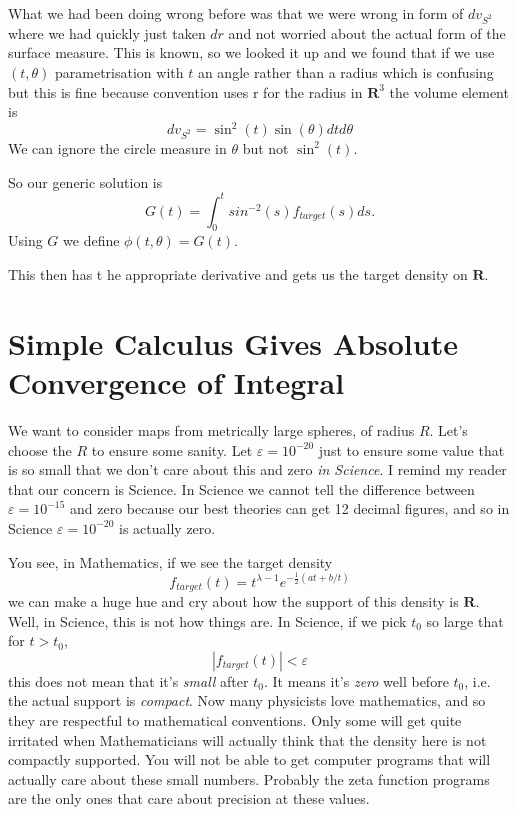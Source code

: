\documentclass{amsart}
\begin{document}
What we had been doing wrong before was that we were wrong in form of $dv_{S^2}$ where we had quickly just taken $dr$ and not worried about the actual form of the surface measure.  This is known, so we looked it up and we found that if we use $(t,\theta)$ parametrisation with $t$ an angle rather than a radius which is confusing but this is fine because convention uses r for the radius in $\mathbf{R}^3$ the volume element is
\[
dv_{S^2} = \sin^2(t) \sin(\theta) dt d\theta
\]
We can ignore the circle measure in $\theta$ but not $\sin^2(t)$.

So our generic solution is
\begin{equation}
\label{Gsol}
G(t) = \int_0^t sin^{-2}(s) f_{target}(s) ds.
\end{equation}
Using $G$ we define $\phi(t,\theta) = G(t)$.

This then has t
he appropriate derivative and gets us the target density on $\mathbf{R}$.

\section{Simple Calculus Gives Absolute Convergence of Integral}

We want to consider maps from metrically large spheres, of radius $R$.  Let's choose the $R$ to ensure some sanity.  Let $\varepsilon= 10^{-20}$ just to ensure some value that is so small that we don't care about this and zero {\em in Science}.  I remind my reader that our concern is Science.  In Science we cannot tell the difference between $\varepsilon=10^{-15}$ and zero because our best theories can get 12 decimal figures, and so in Science $\varepsilon=10^{-20}$ is actually zero.  

You see, in Mathematics, if we see the target density
\[
f_{target}(t) = t^{\lambda-1} e^{-\frac{1}{2}(at+b/t)}
\]
we can make a huge hue and cry about how the support of this density is $\mathbf{R}$.  Well, in Science, this is not how things are.  In Science, if we pick $t_0$ so large that for $t>t_0$,
\[
|f_{target}(t) | <\varepsilon
\]
this does not mean that it's {\em small} after $t_0$.  It means it's {\em zero} well before $t_0$, i.e. the actual support is {\em compact}.  Now many physicists love mathematics, and so they are respectful to mathematical conventions.  Only some will get quite irritated when Mathematicians will actually think that the density here is not compactly supported.  You will not be able to get computer programs that will actually care about these small numbers.  Probably the zeta function programs are the only ones that care about precision at these values.
\end{document}
